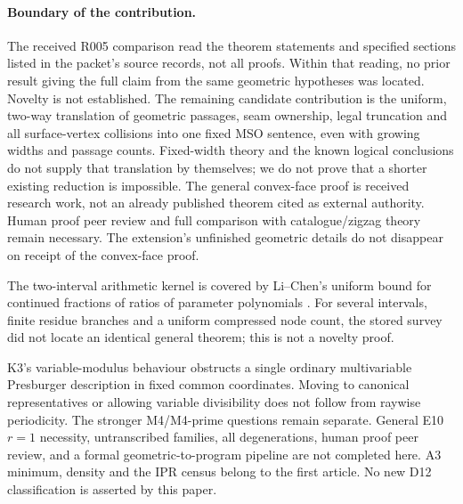 \documentclass[11pt]{amsart}
\theoremstyle{definition}\newtheorem{definition}{Definition}
\begin{document}
\paragraph{Boundary of the contribution.}
The received R005 comparison read the theorem statements and specified
sections listed in the packet's source records, not all proofs. Within
that reading, no prior result giving the full claim from the same
geometric hypotheses was located. Novelty is not established. The
remaining candidate contribution is the uniform, two-way translation
of geometric passages, seam ownership, legal truncation and all
surface-vertex collisions into one fixed MSO sentence, even with
growing widths and passage counts. Fixed-width theory and the known
logical conclusions do not supply that translation by themselves;
we do not prove that a shorter existing reduction is impossible.
The general convex-face proof is received research work, not an
already published theorem cited as external authority. Human proof
peer review and full comparison with catalogue/zigzag theory remain
necessary. The extension's unfinished geometric details do not
disappear on receipt of the convex-face proof.

The two-interval arithmetic kernel is covered by Li--Chen's uniform
bound for continued fractions of ratios of parameter polynomials
\cite[Theorem 27]{LiChen}. For several intervals, finite residue
branches and a uniform compressed node count, the stored survey did
not locate an identical general theorem; this is not a novelty proof.

K3's variable-modulus behaviour obstructs a single ordinary
multivariable Presburger description in fixed common coordinates.
Moving to canonical representatives or allowing variable divisibility
does not follow from raywise periodicity. The stronger M4/M4-prime
questions remain separate. General E10 $r=1$ necessity, untranscribed
families, all degenerations, human proof peer review, and a formal
geometric-to-program pipeline are not completed here. A3 minimum,
density and the IPR census belong to the first article. No new D12
classification is asserted by this paper.

\appendix
\end{document}
